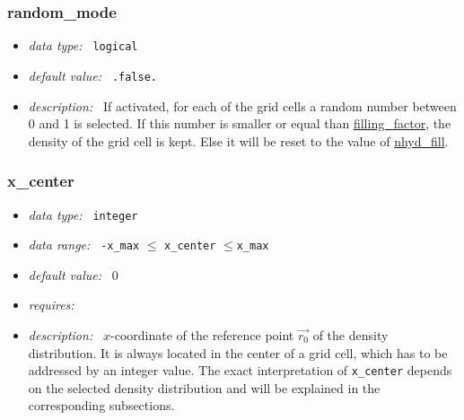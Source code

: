 \documentclass[a4paper,10pt]{article}
\begin{document}
\subsubsection{random\_mode}
\label{hydopt:randommode}
\begin{itemize}
 \item \textit{data type:~} \texttt{logical}
 \item \textit{default value:~} \texttt{.false.}
 \item \textit{description:~} If activated, for each of the grid cells a random 
  number between 0 and 1 is selected. If this number is smaller or equal than 
  \hyperref[hydopt:macrofillingfactor]{filling\_factor}, the density of the 
  grid cell is kept. Else it will be reset to the value of 
  \hyperref[hydopt:nhydfill]{nhyd\_fill}.
\end{itemize}


\subsubsection{x\_center}
\label{hydopt:xcenter}
\begin{itemize}
 \item \textit{data type:~} \texttt{integer}
 \item \textit{data range:~} \texttt{-x\_max} $ \leq$ \texttt{x\_center} 
  $\leq $\texttt{x\_max} 
 \item \textit{default value:~} 0
 \item \textit{requires:~} 
 \item \textit{description:~} $x$-coordinate of the reference point $\vec{r_0}$
  of the density distribution.  It is always located in the center of a grid 
  cell, which has to be addressed by an integer value. 
  The exact interpretation of \texttt{x\_center} depends on the selected 
  density distribution and will be 
  explained in the corresponding subsections.
\end{itemize}
\end{document}
